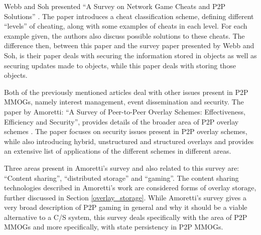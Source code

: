 \documentclass[10pt,a4paper,journal,cspaper,compsoc]{IEEEtran}
\begin{document}
Webb and Soh presented ``A Survey on Network Game Cheats and P2P Solutions'' \cite{survey_p2p_game_cheats}. The paper introduces a cheat
classification scheme, defining different ``levels'' of cheating, along with some examples of cheats in each level. For each example given, the
authors also discuss possible solutions to these cheats. The difference then, between this paper and the survey paper presented by Webb and Soh, is
their paper deals with securing the information stored in objects as well as securing updates made to objects, while this paper deals with storing
those objects.

Both of the previously mentioned articles deal with other issues present in P2P MMOGs, namely interest management, event dissemination and security.
The paper by Amoretti: ``A Survey of Peer-to-Peer Overlay Schemes: Effectiveness, Efficiency and Security'', provides details of the broader area of
P2P overlay schemes \cite{amoretti_p2p_overlay_schemes_survey}. The paper focuses on security issues present in P2P overlay schemes, while also
introducing hybrid, unstructured and structured overlays and provides an extensive list of applications of the different schemes in different areas.

Three areas present in Amoretti's survey and also related to this survey are: ``Content sharing'', ``distributed storage'' and ``gaming''. The
content sharing technologies described in Amoretti's work are considered forms of overlay storage, further discussed in Section
\ref{overlay_storage}. While Amoretti's survey gives a very broad description of P2P gaming in general and why it should be a viable alternative to a
C/S system, this survey deals specifically with the area of P2P MMOGs and more specifically, with state persistency in P2P MMOGs.

%
\end{document}
